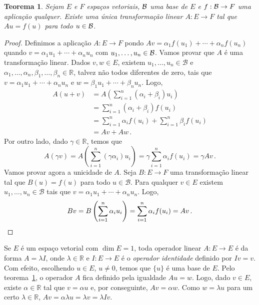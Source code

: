 \documentclass[12pt,a4paper]{article}
\newcommand{\dpar}[1]{\left(#1\right)}
\newcommand{\R}{\mathbb{R}}
\newtheorem{thm}{Teorema}[section]
\theoremstyle{definition}
\begin{document}
\begin{thm}
  \label{thm:4}
  Sejam $E$ e $F$ espaços vetoriais, ${\cal B}$ uma base de $E$ e
  $f:{\cal B}\to F$ uma aplicação qualquer. Existe uma única
  transformação linear $A:E\to F$ tal que $Au=f(u)$ para todo
  $u\in {\cal B}$.
\end{thm}
\begin{proof}
  Definimos a aplicação $A:E\to F$ pondo
  $Av=\alpha_1f(u_1)+\cdots+\alpha_nf(u_n)$ quando
  $v=\alpha_1u_1+\cdots+\alpha_nu_n$ com $u_1,\ldots,u_n\in{\cal
    B}$. Vamos provar que $A$ é uma transformação linear. Dados
  $v,w\in E$, existem $u_1,\ldots,u_n\in \mathcal{B}$ e
  $\alpha_1,\ldots,\alpha_n,\beta_1,\ldots,\beta_n\in \R$, talvez não
  todos diferentes de zero, tais que
  $v=\alpha_1u_1+\cdots+\alpha_nu_n$ e
  $w=\beta_1u_1+\cdots+\beta_nu_n$. Logo,
  \begin{equation*}
    \begin{split}
      A(u+v)&=A\dpar{\sum_{i=1}^n(\alpha_i+\beta_i)u_i}\\
      &=\sum_{i=1}^n(\alpha_i+\beta_i)f(u_i)\\
      &=\sum_{i=1}^n\alpha_if(u_i)+\sum_{i=1}^n\beta_if(u_i)\\
      &=Av+Aw\,.
    \end{split}
  \end{equation*}
  Por outro lado, dado $\gamma\in\R$, temos que
  $$A(\gamma
  v)=A\dpar{\sum_{i=1}^n(\gamma\alpha_i)u_i}=\gamma\sum_{i=1}^n\alpha_if(u_i)=\gamma
  Av\,.$$ Vamos provar agora a unicidade de $A$. Seja $B:E\to F$ uma
  transformação linear tal que $B(u)=f(u)$ para todo
  $u\in\mathcal{B}$. Para qualquer $v\in E$ existem
  $u_1,\ldots,u_n\in\mathcal{B}$ tais que
  $v=\alpha_1u_1+\cdots+\alpha_nu_n$. Logo,
  \begin{equation*}
    Bv=B\dpar{\sum_{i=1}^n\alpha_iu_i}=\sum_{i=1}^n\alpha_if(u_i)=Av\,.\qedhere
  \end{equation*}
\end{proof}

Se $E$ é um espaço vetorial com $\dim E=1$, toda operador linear
$A:E\to E$ é da forma $A=\lambda I$, onde $\lambda\in\R$ e $I:E\to E$
é o \textit{operador identidade} definido por $Iv=v$. Com efeito,
escolhendo $u\in E$, $u\ne 0$, temos que $\{u\}$ é uma base de
$E$. Pelo teorema~\ref{thm:4}, o operador $A$ fica definido pela
igualdade $Au=w$. Logo, dado $v\in E$, existe $\alpha\in\R$ tal que
$v=\alpha u$ e, por conseguinte, $Av=\alpha w$. Como $w=\lambda u$
para um certo $\lambda\in\R$,
$Av=\alpha\lambda u=\lambda v=\lambda Iv$.
\end{document}
